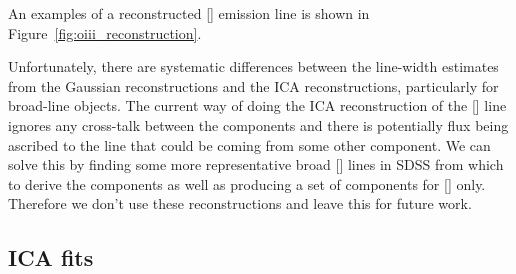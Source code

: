 An examples of a reconstructed [] emission line is shown in Figure~\ref{fig:oiii_reconstruction}. 

Unfortunately, there are systematic differences between the line-width estimates from the Gaussian reconstructions and the ICA reconstructions, particularly for broad-line objects.
The current way of doing the ICA reconstruction of the [] line ignores any cross-talk between the components and there is potentially flux being ascribed to the line that could be coming from some other component. 
We can solve this by finding some more representative broad [] lines in SDSS from which to derive the components as well as producing a set of components for [] only.
Therefore we don't use these reconstructions and leave this for future work. 

\subsection{ICA fits}

